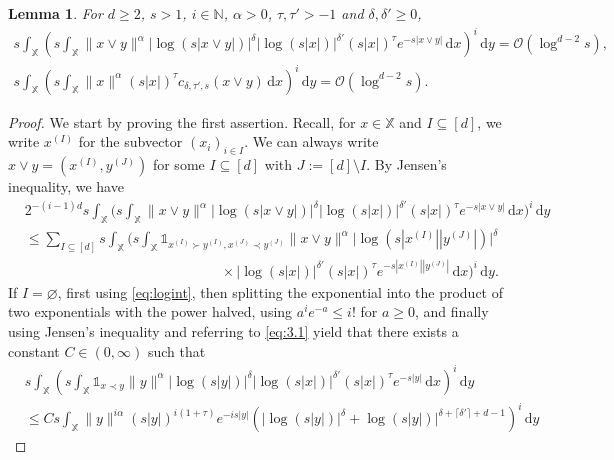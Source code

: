 \documentclass[11pt,reqno]{amsart}
\numberwithin{equation}{section}
\newtheorem{lemma}[theorem]{Lemma}
\theoremstyle{definition}
\newcommand{\N}{\mathbb{N}}
\renewcommand{\emptyset}{\varnothing}
\newcommand{\XX}{\mathbb{X}}
\newcommand{\diff}{{\,\mathrm d}}
\begin{document}
\begin{lemma}\label{lem:maxlog} For $d \ge 2$, $s>1$, $i \in \N$, $\alpha>0$, $\tau, \tau'>-1$ and $\delta,\delta' \ge 0$,
	\begin{gather*}
	s\int_{\XX}  \left(s \int_{\XX} \|x \vee y\|^\alpha  \big| \log (s|x \vee y|)\big|^\delta \big| \log (s|x|)\big|^{\delta'} (s|x|)^\tau e^{-s|x\vee
		y|}  \diff x\right)^i  \diff y=
	\mathcal{O}(\log^{d-2} s),\\
	s \int_{\XX} \left(s\int_{\XX} \|x\|^\alpha (s|x|)^\tau c_{\delta,\tau',s}(x\vee y) \diff x
	\right)^i \diff y
	= \mathcal{O}(\log^{d-2} s). 
	\end{gather*}
\end{lemma}

\begin{proof}
	We start by proving the first assertion. 
	Recall, for $x \in \XX$ and $I \subseteq [d]$, we write $x^{(I)}$ for
	the subvector $(x_i)_{i \in I}$. We can always write $x\vee y=(x^{(I)},y^{(J)})$ for some $I\subseteq [d]$ with
	$J:=[d]\setminus I$. 
	By Jensen's inequality, we have
	\begin{align}\label{eq:maxsplit}
	&2^{-(i-1)d}s\int_{\XX}  \Bigg(s \int_{\XX} \|x \vee y\|^\alpha \big| \log (s|x \vee y|)\big|^\delta  \big| \log (s|x|)\big|^{\delta'} (s|x|)^\tau e^{- s|x\vee
		y|}  \diff x\Bigg)^i \diff y\nonumber\\
	&\le 
	\sum_{I \subseteq [d]} s\int_{\XX}
	\Bigg(s \int_\XX \mathds{1}_{x^{(I)} \succ y^{(I)}, x^{(J)} \prec y^{(J)}}\|x \vee y\|^\alpha  \big| \log (s|x^{(I)}| |y^{(J)}|)\big|^\delta \nonumber\\
	& \qquad \qquad \qquad\qquad \qquad\qquad \qquad\times \big| \log (s|x|)\big|^{\delta'} (s|x|)^\tau e^{- s|x^{(I)}| |y^{(J)}| } \diff x\Bigg)^i \diff y.
	\end{align}
	If $I=\emptyset$, first using \eqref{eq:logint}, then splitting the exponential
	into the product of two exponentials with the power halved, using $a^i e^{-a}
	\le i!$ for $a\geq0$, and finally using Jensen's inequality and referring to \eqref{eq:3.1} yield that there exists a constant $C \in (0,\infty)$ such that
	\begin{align*}
	&s\int_{\XX}  \left(s \int_\XX
	\mathds{1}_{x \prec y} \|y\|^\alpha \big| \log (s|y|)\big|^\delta  \big| \log (s|x|)\big|^{\delta'} (s|x|)^\tau e^{-s |y|} \diff x\right)^i \diff y \\
	&\le  C s\int_{\XX} \|y\|^{i \alpha} (s|y|)^{i(1+\tau)} e^{-i s |y|}  \left(\big| \log (s|y|)\big|^{\delta} + \log (s|y|)\big|^{\delta + \lceil\delta'\rceil + d-1}\right)^i \diff y

\end{align*}
\end{proof}
\end{document}
